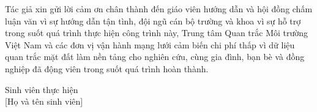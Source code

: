 \documentclass[../DoAn.tex]{subfiles}
\begin{document}
Tác giả xin gửi lời cảm ơn chân thành đến giáo viên hướng dẫn và hội đồng chấm luận văn vì sự hướng dẫn tận tình, đội ngũ cán bộ trường và khoa vì sự hỗ trợ trong suốt quá trình thực hiện công trình này, Trung tâm Quan trắc Môi trường Việt Nam và các đơn vị vận hành mạng lưới cảm biến chi phí thấp vì dữ liệu quan trắc mặt đất làm nền tảng cho nghiên cứu, cùng gia đình, bạn bè và đồng nghiệp đã động viên trong suốt quá trình hoàn thành.

\vspace{1cm}
Sinh viên thực hiện\\
\vspace{1cm}
[Họ và tên sinh viên]
\end{document}
